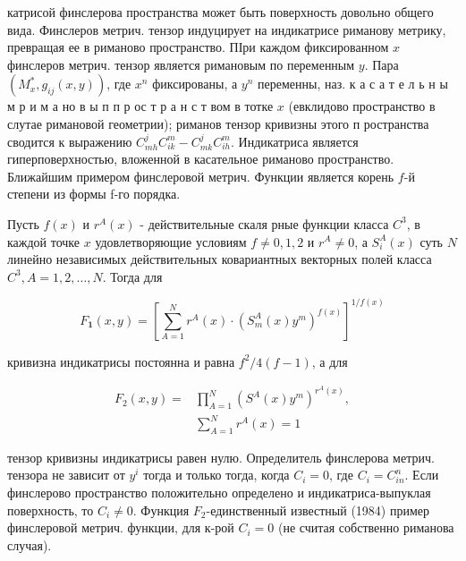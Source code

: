 \documentclass[10pt]{article}
\begin{document}
катрисой финслерова пространства может быть поверхность довольно общего вида. Финслеров метрич. тензор индуцирует на индикатрисе риманову метрику, превращая ее в риманово пространство. ПІри каждом фиксированном $x$ финслеров метрич. тензор является римановым по переменным $y$. Пара $\left(M_{x}^{*}, g_{i j}(x, y)\right)$, где $x^{n}$ фиксированы, а $y^{n}$ переменны, наз. к а с а т е л ь н ы м р и м а но в ы п п р ос т р а н с т вом в тотке $x$ (евклидово пространство в слутае римановой геометрии); риманов тензор кривизны этого п ространства сводится к выражению $C_{m h}^{j} C_{i k}^{m}-C_{m k}^{j} C_{i h}^{m}$. Индикатриса является гиперповерхностью, вложенной в касательное риманово пространство. Ближайшим примером финслеровой метрич. Функции является корень $f$-й степени из формы f-го порядка.



Пусть $f(x)$ и $r^{A}(x)$ - действительные скаля рные функции класса $C^{3}$, в каждой точке $x$ удовлетворяющие условиям $f \neq 0,1,2$ и $r^{A} \neq 0$, а $S_{i}^{A}(x)$ суть $N$ линейно независимых действительных ковариантных векторных полей класса $C^{3}, A=1,2, \ldots, N$. Тогда для



\[

F_{\mathbf{1}}(x, y)=\left[\sum_{A=1}^{N} r^{A}(x) \cdot\left(S_{m}^{A}(x) y^{m}\right)^{f(x)}\right]^{1 / f(x)}

\]



кривизна индикатрисы постоянна и равна $f^{2} / 4(f-1)$, а для



\[

\begin{aligned}

F_{2}(x, y)= & \prod_{A=1}^{N}\left(S^{A}(x) y^{m}\right)^{r^{A}(x)}, \\

& \sum_{A=1}^{N} r^{A}(x)=1

\end{aligned}

\]



тензор кривизны индикатрисы равен нулю. Определитель финслерова метрич. тензора не зависит от $y^{i}$ тогда и только тогда, когда $C_{i}=0$, где $C_{i}=C_{i n}^{n}$. Если финслерово пространство положительно определено и индикатриса-выпуклая поверхность, то $C_{i} \neq 0$. Функция $F_{2}$-единственный известный (1984) пример финслеровой метрич. функции, для к-рой $C_{i}=0$ (не считая собственно риманова случая).
\end{document}
